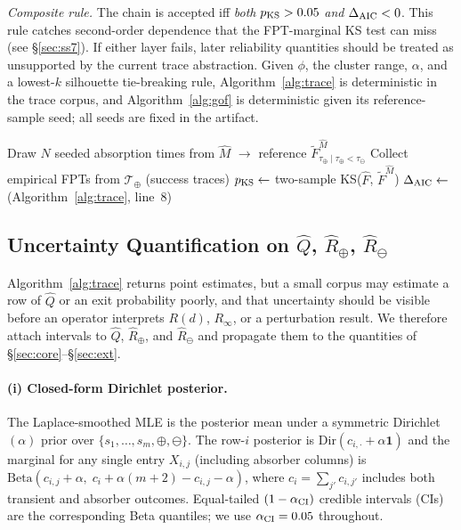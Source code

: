 \emph{Composite rule.} The chain is accepted iff
\emph{both} $p_{\rm KS} > 0.05$ \emph{and} $\Delta_{\rm AIC} < 0$.
This rule catches second-order dependence that the FPT-marginal KS test
can miss (see \S\ref{sec:ss7}). If either layer fails, later
reliability quantities should be treated as unsupported by the current
trace abstraction. Given $\phi$, the cluster range, $\alpha$, and a
lowest-$k$ silhouette tie-breaking rule, Algorithm~\ref{alg:trace} is
deterministic in the trace corpus, and Algorithm~\ref{alg:gof} is
deterministic given its reference-sample seed; all seeds are fixed in
the artifact.

\begin{algorithm}[t]
\small
\DontPrintSemicolon
{}
Draw $N$ seeded absorption times from $\hat M$ $\to$ reference
$\tilde F_{\tau_\oplus \mid \tau_\oplus < \tau_\ominus}^{\hat M}$\;
Collect empirical FPTs from $\mathcal{T}_\oplus$ (success traces)\;
$p_{\rm KS} \leftarrow$ two-sample KS($\hat F$, $\tilde F^{\hat M}$)\;
$\Delta_{\rm AIC} \leftarrow$ (Algorithm~\ref{alg:trace}, line~8)\;
\caption{Composite KS/AIC goodness-of-fit test for the agent-DTMC
         assumption.}
\label{alg:gof}
\end{algorithm}

\subsection{Uncertainty Quantification on \texorpdfstring{$\hat Q$, $\hat R_\oplus$, $\hat R_\ominus$}{Q, R+, R-}}
\label{sec:uq}

Algorithm~\ref{alg:trace} returns point estimates, but a small corpus
may estimate a row of $\hat Q$ or an exit probability poorly, and that
uncertainty should be visible before an operator interprets $R(d)$,
$R_\infty$, or a perturbation result. We therefore attach intervals to
$\hat Q$, $\hat R_\oplus$, and $\hat R_\ominus$ and propagate them to
the quantities of \S\ref{sec:core}--\S\ref{sec:ext}.

\paragraph{(i) Closed-form Dirichlet posterior.}
The Laplace-smoothed MLE is the posterior mean under a symmetric
Dirichlet$(\alpha)$ prior over $\{s_1,\ldots,s_m,\oplus,\ominus\}$. The
row-$i$ posterior is $\mathrm{Dir}(c_{i,\cdot} + \alpha \mathbf{1})$
and the marginal for any single entry $X_{i,j}$ (including absorber
columns) is $\mathrm{Beta}(c_{i,j}+\alpha,\; c_i + \alpha(m+2) -
c_{i,j} - \alpha)$, where $c_i = \sum_{j'} c_{i,j'}$ includes both
transient and absorber outcomes. Equal-tailed $(1-\alpha_{\rm CI})$
credible intervals (CIs) are the corresponding Beta quantiles; we use
$\alpha_{\rm CI}=0.05$ throughout.

